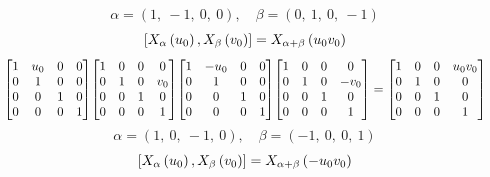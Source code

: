 \documentclass[11pt]{article}
\theoremstyle{definition}
\begin{document}
\[
\alpha = \left( 1, \  -1, \  0, \  0\right), \quad \beta = \left( 0, \  1, \  0, \  -1\right)
\]
\[
\scaletoalign{\textwidth}{\left[ X_{\alpha}\left(u_{0}\right), X_{\beta}\left(v_{0}\right) \right] = X_{\alpha + \beta}\left(u_{0} v_{0}\right)}
\]
\[
\scaletoalign{\textwidth}{{\left[\begin{matrix}1 & u_{0} & 0 & 0\\0 & 1 & 0 & 0\\0 & 0 & 1 & 0\\0 & 0 & 0 & 1\end{matrix}\right]} {\left[\begin{matrix}1 & 0 & 0 & 0\\0 & 1 & 0 & v_{0}\\0 & 0 & 1 & 0\\0 & 0 & 0 & 1\end{matrix}\right]} {\left[\begin{matrix}1 & - u_{0} & 0 & 0\\0 & 1 & 0 & 0\\0 & 0 & 1 & 0\\0 & 0 & 0 & 1\end{matrix}\right]} {\left[\begin{matrix}1 & 0 & 0 & 0\\0 & 1 & 0 & - v_{0}\\0 & 0 & 1 & 0\\0 & 0 & 0 & 1\end{matrix}\right]} = {\left[\begin{matrix}1 & 0 & 0 & u_{0} v_{0}\\0 & 1 & 0 & 0\\0 & 0 & 1 & 0\\0 & 0 & 0 & 1\end{matrix}\right]}}
\]
\[
\alpha = \left( 1, \  0, \  -1, \  0\right), \quad \beta = \left( -1, \  0, \  0, \  1\right)
\]
\[
\scaletoalign{\textwidth}{\left[ X_{\alpha}\left(u_{0}\right), X_{\beta}\left(v_{0}\right) \right] = X_{\alpha + \beta}\left(- u_{0} v_{0}\right)}
\]
\end{document}
